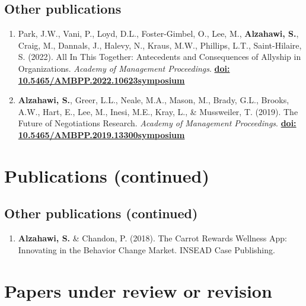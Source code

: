 \documentclass[11pt,a4paper,]{awesome-cv}
\providecommand{\tightlist}{%
	\setlength{\itemsep}{0pt}\setlength{\parskip}{0pt}}
\begin{document}
\hypertarget{other-publications}{%
\subsection{Other publications}\label{other-publications}}

\begin{enumerate}
\def\labelenumi{\arabic{enumi}.}
\setcounter{enumi}{5}
\item
  Park, J.W., Vani, P., Loyd, D.L., Foster-Gimbel, O., Lee, M.,
  \textbf{Alzahawi, S.}, Craig, M., Dannals, J., Halevy, N., Kraus,
  M.W., Phillips, L.T., Saint-Hilaire, S. (2022). All In This Together:
  Antecedents and Consequences of Allyship in Organizations.
  \emph{Academy of Management Proceedings}.
  \href{https://doi.org/10.5465/AMBPP.2022.10623symposium}{\textbf{doi:
  10.5465/AMBPP.2022.10623symposium}}
\item
  \textbf{Alzahawi, S.}, Greer, L.L., Neale, M.A., Mason, M., Brady,
  G.L., Brooks, A.W., Hart, E., Lee, M., Inesi, M.E., Kray, L., \&
  Mussweiler, T. (2019). The Future of Negotiations Research.
  \emph{Academy of Management Proceedings}.
  \href{https://doi.org/10.5465/AMBPP.2019.13300symposium}{\textbf{doi:
  10.5465/AMBPP.2019.13300symposium}}
\end{enumerate}

\hypertarget{publications-continued}{%
\section{Publications (continued)}\label{publications-continued}}

\hypertarget{other-publications-continued}{%
\subsection{Other publications
(continued)}\label{other-publications-continued}}

\begin{enumerate}
\def\labelenumi{\arabic{enumi}.}
\setcounter{enumi}{7}
\tightlist
\item
  \textbf{Alzahawi, S.} \& Chandon, P. (2018). The Carrot Rewards
  Wellness App: Innovating in the Behavior Change Market. INSEAD Case
  Publishing.
\end{enumerate}

\hypertarget{papers-under-review-or-revision}{%
\section{Papers under review or
revision}\label{papers-under-review-or-revision}}
\end{document}

